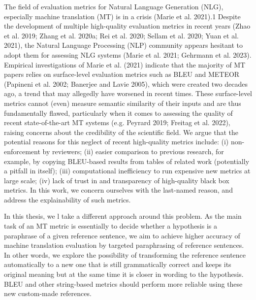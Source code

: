 The field of evaluation metrics for Natural Language Generation (NLG), especially machine translation (MT) is in a crisis (Marie et al. 2021).1 Despite the development of multiple high-quality evaluation metrics in recent years (Zhao et al. 2019; Zhang et al. 2020a; Rei et al. 2020; Sellam et al. 2020; Yuan et al. 2021), the Natural Language Processing (NLP) community appears hesitant to adopt them for assessing NLG systems (Marie et al. 2021; Gehrmann et al. 2023). Empirical investigations of Marie et al. (2021) indicate that the majority of MT papers relies on surface-level evaluation metrics such as BLEU and METEOR (Papineni et al. 2002;
Banerjee and Lavie 2005), which were created two decades ago, a trend that may allegedly have worsened in recent times. These surface-level metrics cannot (even) measure semantic similarity
of their inputs and are thus fundamentally flawed, particularly when it comes to assessing the quality of recent state-of-the-art MT systems (e.g. Peyrard 2019; Freitag et al. 2022), raising
concerns about the credibility of the scientific field. We argue that the potential reasons for this neglect of recent high-quality metrics include: (i) non-enforcement by reviewers; (ii) easier
comparison to previous research, for example, by copying BLEU-based results from tables of related work (potentially a pitfall in itself); (iii) computational inefficiency to run expensive new
metrics at large scale; (iv) lack of trust in and transparency of high-quality black box metrics. In this work, we concern ourselves with the last-named reason, and address the explainability
of such metrics.



In this thesis, we l take a different approach around this problem. 
As the main task of an MT metric is essentially to decide whether a hypothesis is a paraphrase of a given reference sentence, we aim to achieve higher accuracy of machine translation evaluation by targeted paraphrasing of reference sentences. In other words, we explore the possibility of transforming the reference sentence automatically to a new one that is still grammatically correct and keeps its original meaning but at the same time it is closer in wording to the hypothesis.
BLEU and other string-based metrics should perform more reliable using these new custom-made references.

